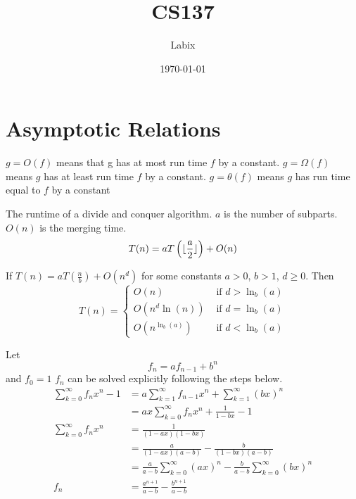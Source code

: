 \documentclass[a4paper]{article}
\title{CS137}
\author{Labix}
\date{\today}
\begin{document}
\maketitle
\begin{abstract}
\end{abstract}
\pagebreak
\tableofcontents
\pagebreak

\section{Asymptotic Relations}
\begin{defn} $g=O(f)$ means that g has at most run time $f$ by a constant. $g=\Omega(f)$ means $g$ has at least run time $f$ by a constant. $g=\theta(f)$ means $g$ has run time equal to $f$ by a constant
\end{defn}

\begin{thm} The runtime of a divide and conquer algorithm. $a$ is the number of subparts. $O(n)$ is the merging time. $$T(n)=aT\left(\lfloor\frac{a}{2}\rfloor\right)+O(n)$$
\end{thm}

\begin{thm} If $T(n)=aT\left(\frac{n}{b}\right)+O(n^d)$ for some constants $a>0$, $b>1$, $d\geq 0$. Then $$T(n)=\begin{cases}O(n) & \text{ if }d>\ln_b(a)\\O(n^d\ln(n)) & \text{ if }d=\ln_b(a)\\O(n^{\ln_b(a)}) & \text{ if }d<\ln_b(a)\end{cases}$$
\end{thm}

\begin{thm} Let $$f_n=af_{n-1}+b^n$$ and $f_0=1$ $f_n$ can be solved explicitly following the steps below. 
\begin{align*}
\sum_{k=0}^\infty f_nx^n-1&=a\sum_{k=1}^\infty f_{n-1}x^n+\sum_{k=1}^\infty(bx)^n\\
&=ax\sum_{k=0}^\infty f_{n}x^n+\frac{1}{1-bx}-1\\
\sum_{k=0}^\infty f_nx^n&=\frac{1}{(1-ax)(1-bx)}\\
&=\frac{a}{(1-ax)(a-b)}-\frac{b}{(1-bx)(a-b)}\\
&=\frac{a}{a-b}\sum_{k=0}^\infty (ax)^n-\frac{b}{a-b}\sum_{k=0}^\infty (bx)^n\\
f_n&=\frac{a^{n+1}}{a-b}-\frac{b^{n+1}}{a-b}\\
\end{align*}
\end{thm}
\end{document}
